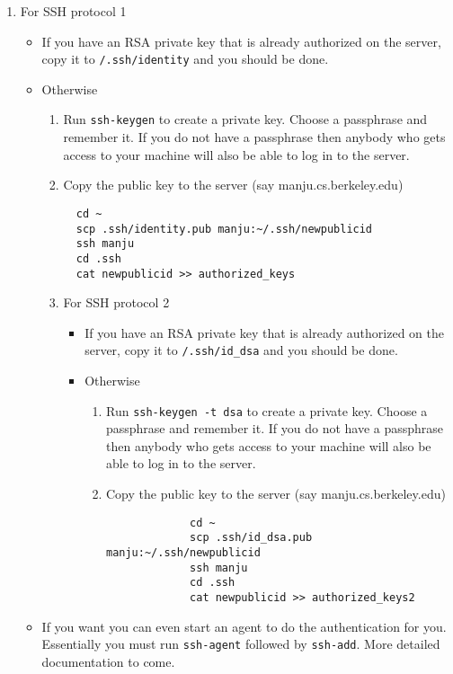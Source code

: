 \documentclass{article}
\def\t#1{{\tt #1}}
\begin{document}
\begin{enumerate}
\item For SSH protocol 1
  \begin{itemize}
  \item If you have an RSA private key that is already authorized on 
        the server, copy it to \t{\home{}/.ssh/identity} and you 
        should be done.
  \item Otherwise
     \begin{enumerate}
       \item Run \t{ssh-keygen} to create a private key. 
        Choose a passphrase and
        remember it. If you do not have a passphrase then anybody who gets
        access to your machine will also be able to log in to the server.
       \item Copy the public key to the server (say manju.cs.berkeley.edu)
  \begin{verbatim}
  cd ~
  scp .ssh/identity.pub manju:~/.ssh/newpublicid
  ssh manju
  cd .ssh
  cat newpublicid >> authorized_keys
  \end{verbatim}

\item For SSH protocol 2

  \begin{itemize}
  \item If you have an RSA private key that is already authorized on 
        the server, copy it to \t{\home{}/.ssh/id_dsa} and you 
        should be done.
  \item Otherwise
     \begin{enumerate}
       \item Run \t{ssh-keygen -t dsa} to create a private key. 
        Choose a passphrase and
        remember it. If you do not have a passphrase then anybody who gets
        access to your machine will also be able to log in to the server.
       \item Copy the public key to the server (say manju.cs.berkeley.edu)
             \begin{verbatim}
             cd ~
             scp .ssh/id_dsa.pub manju:~/.ssh/newpublicid
             ssh manju
             cd .ssh
             cat newpublicid >> authorized_keys2
             \end{verbatim}
     \end{enumerate}
  \end{itemize}
\end{enumerate}


\item If you want you can even start an agent to do the authentication for
you. Essentially you must run \t{ssh-agent} followed by \t{ssh-add}. More
detailed documentation to come.
\end{itemize}


\end{enumerate}
\end{document}
